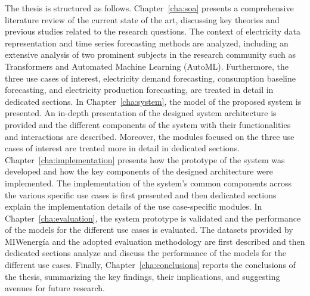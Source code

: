 The thesis is structured as follows. 
Chapter~\ref{cha:soa} presents a comprehensive literature review of the current state of the art, discussing key theories and previous studies related to the research questions.
The context of electricity data representation and time series forecasting methods are analyzed, including an extensive analysis of two prominent subjects in the research community such as Transformers and Automated Machine Learning (AutoML).
Furthermore, the three use cases of interest, electricity demand forecasting, consumption baseline forecasting, and electricity production forecasting, are treated in detail in dedicated sections.
In Chapter~\ref{cha:system}, the model of the proposed system is presented.
An in-depth presentation of the designed system architecture is provided and the different components of the system with their functionalities and interactions are described.
Moreover, the modules focused on the three use cases of interest are treated more in detail in dedicated sections.
Chapter~\ref{cha:implementation} presents how the prototype of the system was developed and how the key components of the designed architecture were implemented.
The implementation of the system’s common components across the various specific use cases is first presented and then dedicated sections explain the implementation details of the use case-specific modules.
In Chapter~\ref{cha:evaluation}, the system prototype is validated and the performance of the models for the different use cases is evaluated.
The datasets provided by MIWenergía and the adopted evaluation methodology are first described and then dedicated sections analyze and discuss the performance of the models for the different use cases.
Finally, Chapter~\ref{cha:conclusions} reports the conclusions of the thesis, summarizing the key findings, their implications, and suggesting avenues for future research.
